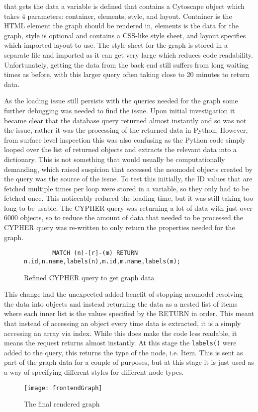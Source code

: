 that gets the data a variable is defined that contains a Cytoscape object which takes 4 parameters: container, elements, 
style, and layout. Container is the HTML element the graph should be rendered in, elements is the data for the graph, style is optional and contains a 
CSS-like style sheet, and layout specifies which imported layout to use. The style sheet for the graph is stored in a separate file and imported as 
it can get very large which reduces code readability. Unfortunately, getting the data from the back end still suffers from long waiting times as before, 
with this larger query often taking close to 20 minutes to return data.

As the loading issue still persists with the queries needed for the graph some further debugging was needed to find the issue. 
Upon initial investigation it became clear that the database query returned almost instantly and so was not the issue, rather it was the 
processing of the returned data in Python. However, from surface level inspection this was also confusing as the Python code simply looped 
over the list of returned objects and extracts the relevant data into a dictionary. This is not something that would usually be computationally demanding, which 
raised suspicion that accessed the neomodel objects created by the query was the source of the issue. To test this initially, the ID values that are fetched 
multiple times per loop were stored in a variable, so they only had to be fetched once. This noticeably reduced the loading time, but it was still taking too long 
to be usable. The CYPHER query was returning a lot of data with just over 6000 objects, so to reduce the amount of data that needed to be processed the 
CYPHER query was re-written to only return the properties needed for the graph.
\begin{figure}[H]
    \begin{lstlisting}
        MATCH (n)-[r]-(m) RETURN n.id,n.name,labels(n),m.id,m.name,labels(m);
    \end{lstlisting}
    \caption{Refined CYPHER query to get graph data}
\end{figure}
This change had the unexpected added benefit of stopping neomodel resolving the data into objects and instead returning the data 
as a nested list of items where each inner list is the values specified by the RETURN in order. This meant that instead of accessing an object 
every time data is extracted, it is a simply accessing an array via index. While this does make the code less readable, it means the request returns almost instantly.
At this stage the \verb|labels()| were added to the query, this returns the type of the node, i.e. Item. This is sent as part of the graph data for a couple of purposes, 
but at this stage it is just used as a way of specifying different styles for different node types.
\begin{figure}[H]
    \centering
    \texttt{[image: frontendGraph]}
    \caption{The final rendered graph}
\end{figure}

